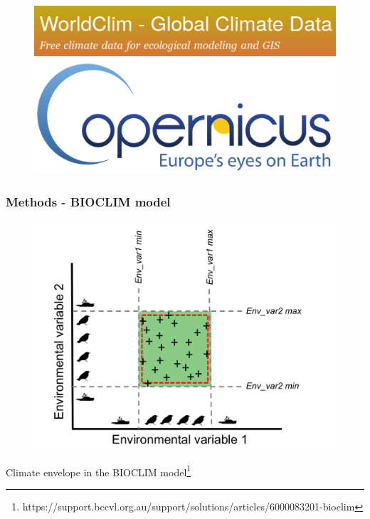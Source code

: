 \documentclass[10pt, aspectratio=1610]{beamer}
\begin{document}
\begin{frame}
\begin{figure}
    \centering
    \hspace*{-1cm}\includegraphics[scale=0.20]{fig/logo-worldclim.png}%
    \hspace*{4.5cm}\includegraphics[scale=0.40]{fig/logo-copernicus.png}
  \end{figure}
\end{frame}

\begin{frame}
  \frametitle{Methods - BIOCLIM model}
  \begin{figure}
    \centering
    \hspace*{-0cm}\includegraphics[scale=0.25]{fig/bioclim_bccvl.png}
  \end{figure}
  \centering
  Climate envelope in the BIOCLIM model\footnote{\tiny https://support.bccvl.org.au/support/solutions/articles/6000083201-bioclim}
\end{frame}
\end{document}
